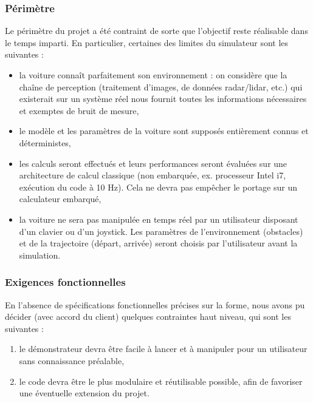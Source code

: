 \documentclass[a4paper,12pt]{report}
\newcommand{\bi}{\begin{itemize}}
\newcommand{\ei}{\end{itemize}}
\newcommand{\itemo}{\item[\textsf{o}]}
\begin{document}
\subsubsection{Périmètre} 
Le périmètre du projet a été contraint de sorte que l'objectif reste réalisable dans le temps imparti. En particulier, certaines des limites du simulateur sont les suivantes :
\bi
\itemo la voiture connaît parfaitement son environnement : on considère que la chaîne de perception (traitement d'images, de données radar/lidar, etc.) qui existerait sur un système réel nous fournit toutes les informations nécessaires et exemptes de bruit de mesure,
\itemo le modèle et les paramètres de la voiture sont supposés entièrement connus et déterministes,
\itemo les calculs seront effectués et leurs performances seront évaluées sur une architecture de calcul classique (non embarquée, ex. processeur Intel i7, exécution du code à 10 Hz). Cela ne devra pas empêcher le portage sur un calculateur embarqué,
\itemo la voiture ne sera pas manipulée en temps réel par un utilisateur disposant d'un clavier ou d'un joystick. Les paramètres de l'environnement (obstacles) et de la trajectoire (départ, arrivée) seront choisis par l'utilisateur avant la simulation.
\ei



\subsubsection{Exigences fonctionnelles} 
En l'absence de spécifications fonctionnelles précises sur la forme, nous avons pu décider (avec accord du client) quelques contraintes haut niveau, qui sont les suivantes :
\begin{enumerate}
\item le démonstrateur devra être facile à lancer et à manipuler pour un utilisateur sans connaissance préalable,
\item le code devra être le plus modulaire et réutilisable possible, afin de favoriser une éventuelle extension du projet.
\end{enumerate}

\bigskip
\end{document}
